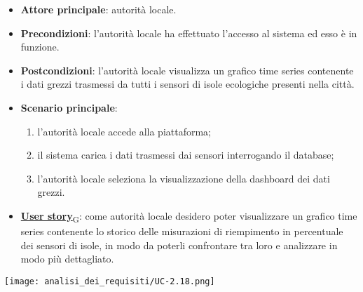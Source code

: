 \begin{itemize}
	\item \textbf{Attore principale}: autorità locale.
	\item \textbf{Precondizioni}: l'autorità locale ha effettuato l'accesso al sistema ed esso è in funzione.
	\item \textbf{Postcondizioni}: l'autorità locale visualizza un grafico time series contenente i dati grezzi trasmessi da tutti i sensori
	      di isole ecologiche presenti nella città.
	\item \textbf{Scenario principale}:
	      \begin{enumerate}
		      \item l'autorità locale accede alla piattaforma;
		      \item il sistema carica i dati trasmessi dai sensori interrogando il database;
		      \item l'autorità locale seleziona la visualizzazione della dashboard dei dati grezzi.
	      \end{enumerate}
	\item \href{https://7last.github.io/docs/rtb/documentazione-interna/glossario\#user-story}{\textbf{User story}\textsubscript{G}}:
	      come autorità locale desidero poter visualizzare un grafico time series contenente lo storico delle misurazioni di riempimento in percentuale
	      dei sensori di isole, in modo da poterli confrontare tra loro e analizzare in modo più dettagliato.
\end{itemize}
\begin{center}
	\texttt{[image: analisi\_dei\_requisiti/UC-2.18.png]}
\end{center}


